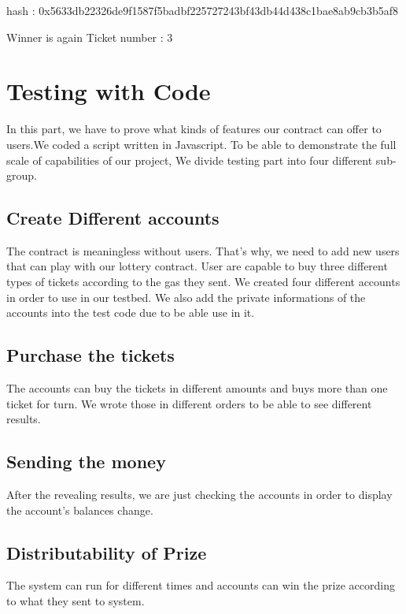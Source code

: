 \documentclass[]{scrreprt}
\begin{document}
		hash : 0x5633db22326de9f1587f5badbf225727243bf43db44d438c1bae8ab9cb3b5af8

		Winner is again Ticket number : 3
		\section{Testing with Code}
		 In this part, we have to prove what kinds of features our contract can offer to users.We coded a script written in Javascript\cite{JavaScript}.  To be able to demonstrate the full scale of capabilities of our project, We divide testing part into four different sub-group.
		  \subsection{Create Different accounts}
			The contract is meaningless without users. That's why, we need to add new users that can play with our lottery contract. User are capable to buy three different types of tickets according to the gas they sent. We created four different accounts in order to use in our testbed. We also add the private informations of the accounts into the test code due to be able use in it.
			\subsection{Purchase the tickets}
			The accounts can buy the tickets in different amounts and buys more than one ticket for turn. We wrote  those in different orders to be able to see different results. 
			\subsection{Sending the money}
			After the revealing results, we are just checking the accounts in order to display the account's balances change. 
			\subsection{Distributability of Prize}
			The system can run for different times and accounts can win the prize according to what they sent to system.
			
\end{document}
